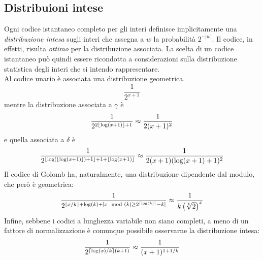 
\subsection{Distribuioni intese}
Ogni codice istantaneo completo per gli interi definisce implicitamente una \textit{distribuzione intesa} sugli interi che assegna a $w$ la probabilità $2^{-|w|}$. Il codice, in effetti, risulta \textit{ottimo} per la distribuzione associata. La scelta di un codice istantaneo può quindi essere ricondotta a considerazioni sulla distribuzione statistica degli interi che si intendo rappresentare.\\
Al codice unario è associata una distribuzione geometrica.
\begin{equation*}
    \frac{1}{2^{x + 1}}
\end{equation*}
mentre la distribuzione associata a $\gamma$ è
\begin{equation*}
    \frac{1}{2^{2\left\lfloor \log(x + 1) \right\rfloor + 1}} \approx \frac{1}{2(x + 1)^2}
\end{equation*}
e quella associata a $\delta$ è
\begin{equation*}
    \frac{1}{2^{\left\lfloor \log(\left\lfloor \log(x + 1) \right\rfloor) + 1 \right\rfloor + 1 + \left\lfloor \log(x + 1) \right\rfloor}} \approx \frac{1}{2(x + 1)(\log(x + 1) + 1)^2}
\end{equation*}
Il codice di Golomb ha, naturalmente, una distribuzione dipendente dal modulo, che però è geometrica:
\begin{equation*}
    \frac{1}{2^{\left\lfloor x / k \right\rfloor + \log(k) + [x\mod(k) \geq 2^{\left\lceil \log(k) \right\rceil} - k]}} \approx \frac{1}{k\left(\sqrt[k]{2}\right)^x}
\end{equation*}
Infine, sebbene i codici a lunghezza variabile non siano completi, a meno di un fattore di normalizzazione è comunque possibile osservarne la distribuzione intesa:
\begin{equation*}
    \frac{1}{2^{\left\lceil \log(x) / k \right\rceil(k + 1)}} \approx \frac{1}{(x + 1)^{1 + 1/k}}
\end{equation*}
